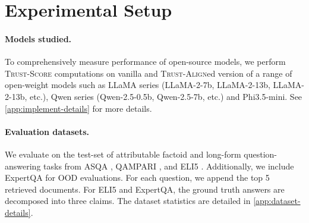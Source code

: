 \documentclass{article} %
\newcommand{\method}[0]{\textsc{Trust-Align}}
\newcommand{\metric}[0]{\textsc{Trust-Score}}
\begin{document}
\begin{table}
\centering
\vspace*{-1em}
%
\caption{\footnotesize{Fraction of each hallucination amongst all the observed hallucinations in \(\mathcal{M}_{sft}\) (40,985), with possible overlap. $w_i$ shows the severity computation of each hallucination. $I_{\text{condition}}$ = 1 if condition is True otherwise it is 0. See \cref{fig:hallucination-errors-breakdown} for the detailed breakdown of the last three errors.}}\vspace*{-1em}
%
\hfill
%
\label{tab:breakdown-hal-percentage}
\vspace*{-2em}
\label{table: error-types_app}
\end{table}


\section{Experimental Setup}

\paragraph{Models studied.} To comprehensively measure performance of open-source models, we perform \metric{} computations on vanilla and \method{}ed version of a range of open-weight models such as LLaMA series (LLaMA-2-7b, LLaMA-2-13b, LLaMA-2-13b, etc.), Qwen series (Qwen-2.5-0.5b, Qwen-2.5-7b, etc.) and Phi3.5-mini. See \cref{app:implement-details} for more details.

\paragraph{Evaluation datasets.} We evaluate on the test-set of attributable factoid and long-form question-answering tasks from ASQA \citep{stelmakh2023asqafactoidquestionsmeet}, QAMPARI \citep{amouyal2023qampariopendomainquestionanswering}, and ELI5 \citep{fan2019eli5longformquestion}. Additionally, we include ExpertQA \citep{malaviya2024expertqaexpertcuratedquestionsattributed} for OOD evaluations. For each question, we append the top 5 retrieved documents. For ELI5 and ExpertQA, the ground truth answers are decomposed into three claims. The dataset statistics are detailed in \cref{app:dataset-details}. 
\end{document}
